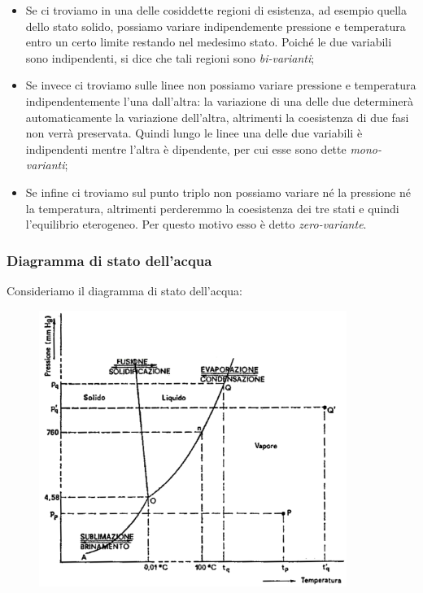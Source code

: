 \begin{itemize}
    \item Se ci troviamo in una delle cosiddette regioni di esistenza, ad esempio quella dello stato solido, possiamo variare indipendemente pressione e temperatura entro un certo limite restando nel medesimo stato. Poiché le due variabili sono indipendenti, si dice che tali regioni sono \textit{bi-varianti};
    \item Se invece ci troviamo sulle linee non possiamo variare pressione e temperatura indipendentemente l'una dall'altra: la variazione di una delle due determinerà automaticamente la variazione dell'altra, altrimenti la coesistenza di due fasi non verrà preservata. Quindi lungo le linee una delle due variabili è indipendenti mentre l'altra è dipendente, per cui esse sono dette \textit{mono-varianti};
    \item Se infine ci troviamo sul punto triplo non possiamo variare né la pressione né la temperatura, altrimenti perderemmo la coesistenza dei tre stati e quindi l'equilibrio eterogeneo. Per questo motivo esso è detto \textit{zero-variante}.
\end{itemize}

\subsubsection{Diagramma di stato dell'acqua}
Consideriamo il diagramma di stato dell'acqua:

\begin{figure}[H]
    \centering
    \includegraphics[width=10cm]{immagini/diagramma_di_stato_acqua.png}
\end{figure}

